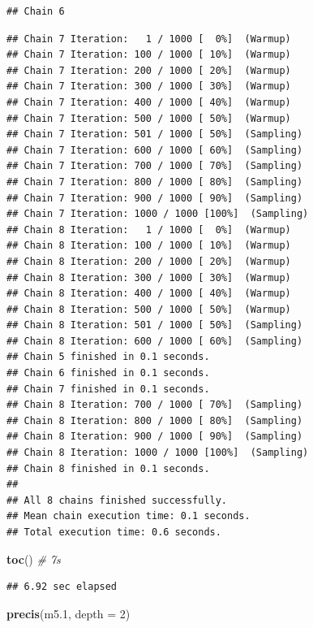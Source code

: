 \documentclass[
]{book}
\newenvironment{Shaded}{\begin{snugshade}}{\end{snugshade}}
\newcommand{\AttributeTok}[1]{\textcolor[rgb]{0.13,0.29,0.53}{#1}}
\newcommand{\CommentTok}[1]{\textcolor[rgb]{0.56,0.35,0.01}{\textit{#1}}}
\newcommand{\DecValTok}[1]{\textcolor[rgb]{0.00,0.00,0.81}{#1}}
\newcommand{\FloatTok}[1]{\textcolor[rgb]{0.00,0.00,0.81}{#1}}
\newcommand{\FunctionTok}[1]{\textcolor[rgb]{0.13,0.29,0.53}{\textbf{#1}}}
\newcommand{\NormalTok}[1]{#1}
\begin{document}
\begin{verbatim}
## Chain 6
\end{verbatim}

\begin{verbatim}
## Chain 7 Iteration:   1 / 1000 [  0%]  (Warmup) 
## Chain 7 Iteration: 100 / 1000 [ 10%]  (Warmup) 
## Chain 7 Iteration: 200 / 1000 [ 20%]  (Warmup) 
## Chain 7 Iteration: 300 / 1000 [ 30%]  (Warmup) 
## Chain 7 Iteration: 400 / 1000 [ 40%]  (Warmup) 
## Chain 7 Iteration: 500 / 1000 [ 50%]  (Warmup) 
## Chain 7 Iteration: 501 / 1000 [ 50%]  (Sampling) 
## Chain 7 Iteration: 600 / 1000 [ 60%]  (Sampling) 
## Chain 7 Iteration: 700 / 1000 [ 70%]  (Sampling) 
## Chain 7 Iteration: 800 / 1000 [ 80%]  (Sampling) 
## Chain 7 Iteration: 900 / 1000 [ 90%]  (Sampling) 
## Chain 7 Iteration: 1000 / 1000 [100%]  (Sampling) 
## Chain 8 Iteration:   1 / 1000 [  0%]  (Warmup) 
## Chain 8 Iteration: 100 / 1000 [ 10%]  (Warmup) 
## Chain 8 Iteration: 200 / 1000 [ 20%]  (Warmup) 
## Chain 8 Iteration: 300 / 1000 [ 30%]  (Warmup) 
## Chain 8 Iteration: 400 / 1000 [ 40%]  (Warmup) 
## Chain 8 Iteration: 500 / 1000 [ 50%]  (Warmup) 
## Chain 8 Iteration: 501 / 1000 [ 50%]  (Sampling) 
## Chain 8 Iteration: 600 / 1000 [ 60%]  (Sampling) 
## Chain 5 finished in 0.1 seconds.
## Chain 6 finished in 0.1 seconds.
## Chain 7 finished in 0.1 seconds.
## Chain 8 Iteration: 700 / 1000 [ 70%]  (Sampling) 
## Chain 8 Iteration: 800 / 1000 [ 80%]  (Sampling) 
## Chain 8 Iteration: 900 / 1000 [ 90%]  (Sampling) 
## Chain 8 Iteration: 1000 / 1000 [100%]  (Sampling) 
## Chain 8 finished in 0.1 seconds.
## 
## All 8 chains finished successfully.
## Mean chain execution time: 0.1 seconds.
## Total execution time: 0.6 seconds.
\end{verbatim}

\begin{Shaded}
\begin{Highlighting}[]
\FunctionTok{toc}\NormalTok{() }\CommentTok{\# 7s}
\end{Highlighting}
\end{Shaded}

\begin{verbatim}
## 6.92 sec elapsed
\end{verbatim}

\begin{Shaded}
\begin{Highlighting}[]
\FunctionTok{precis}\NormalTok{(m5}\FloatTok{.1}\NormalTok{, }\AttributeTok{depth =} \DecValTok{2}\NormalTok{)}
\end{Highlighting}
\end{Shaded}
\end{document}
